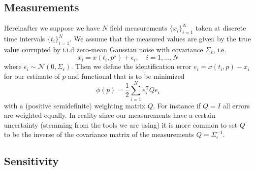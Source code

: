 \documentclass[a4paper]{article}
\newcommand{\T}{\mathsf{T}}
\theoremstyle{plain}
\theoremstyle{definition}
\theoremstyle{remark}
\begin{document}
\subsection{Measurements}

Hereinafter we suppose we have $N$ field measurements $\{x_i\}_{i=1}^N$ taken
at discrete time intervals $\{t_i\}_{i=1}^N$. We assume that the measured
values are given by the true value corrupted by i.i.d zero-mean Gaussian noise
with covariance $\Sigma_\epsilon$, i.e.
\begin{equation} \label{eqn:measurement-model}
  x_i = x(t_i, p^\star) + \epsilon_i, \quad i = 1, \ldots, N
\end{equation}
where  $\epsilon_i \sim \mathcal{N}(0, \Sigma_\epsilon)$. Then we define the
identification error $e_i = x(t_i, p) - x_i$ for our estimate of $p$ and
functional that is to be minimized
\[
  \phi(p) = \frac{1}{2} \sum_{i=1}^N e_i^\T Q e_i
\]
with a (positive semidefinite) weighting matrix $Q$. For instance if $Q = I$
all errors are weighted equally. In reality since our measurements have a
certain uncertainty (stemming from the tools we are using) it is more common
to set $Q$ to be the inverse of the covariance matrix of the measurements $Q =
\Sigma_\epsilon^{-1}$.

\subsection{Sensitivity}
\end{document}
